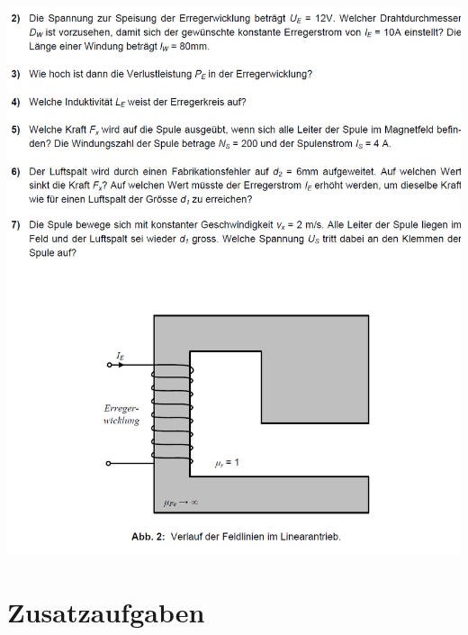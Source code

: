\documentclass[a4paper, 8pt, landscape]{scrartcl} %
\begin{document}
\begin{multicols}{2}
\includegraphics[width=\columnwidth]{img/induktion_2_1.PNG} \\
\vfill \null \columnbreak



  \newpage
  \section{Zusatzaufgaben}





\end{multicols}
\end{document}
